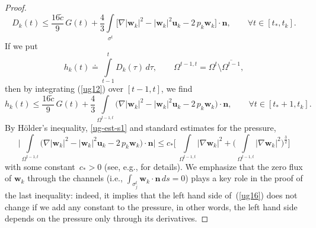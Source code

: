 \documentclass[11pt]{article}
\numberwithin{equation}{section}
\numberwithin{figure}{section}
\def\ue{{\mathbf u}}
\def\cc{{\tilde c}}
\def\n{{\mathbf n}}
\def\we{{\mathbf w}}
\begin{document}
\begin{proof}
	\begin{equation}\label{ug12}D_k(t)\le\frac{16 \cc}9 \,G(t)+\frac43\int\limits_{\sigma^t}\biggl[\nabla |\we_k|^2-|\we_k|^2\ue_k-2\,p_k\we_k\biggr]\cdot\n, \qquad \forall t \in [t_*, t_k].
	\end{equation}
	If we put
\begin{equation}\label{ug13}
h_k(t)\doteq \int\limits_{t-1}^t D_k(\tau)\,d\tau,\qquad\Omega^{t-1,t}=\Omega^t\setminus\overline{\Omega^{t-1}},
\end{equation}
then by integrating (\ref{ug12}) over $[t-1, t]$, we find
	\begin{equation}\label{ug15}
		h_k(t)\le\frac{16 \cc}9 \,G(t)+\frac43\int\limits_{\Omega^{t-1,t}}\biggl(\nabla |\we_k|^2-|\we_k|^2\ue_k-2\,p_k\we_k\biggr)\cdot\n, \qquad \forall t \in [t_*+1, t_k].
	\end{equation}
	By H\"older's inequality, \eqref{ug-est-s1} and standard estimates for the pressure,
	\begin{equation}\label{ug16}
		\biggl|\int\limits_{\Omega^{t-1,t}}\biggl(\nabla |\we_k|^2-|\we_k|^2\ue_k-2\,p_k\we_k\biggr)\cdot\n\biggr|\le c_* \biggl[\  \int\limits_{\Omega^{t-1,t}}|\nabla\we_k|^2+\biggl(\int\limits_{\Omega^{t-1,t}}|\nabla\we_k|^2\biggr)^\frac32\biggr]
	\end{equation}
	with some constant~$c_*>0$ (see, e.g., \cite[proof of Theorem~2.2]{ladyzhenskaya1983determination} for details). We emphasize that the zero flux of $\we_k$ through the channels (i.e., $\int_{\sigma_j^t} \we_k \cdot \mathbf{n} \, ds = 0$)  plays a key role in the proof of the last inequality: indeed, it implies that the left hand side of~(\ref{ug16}) does not change if we add any constant to the pressure, in other words, the left hand side depends on  the pressure only through its derivatives.
	

\end{proof}
\end{document}
